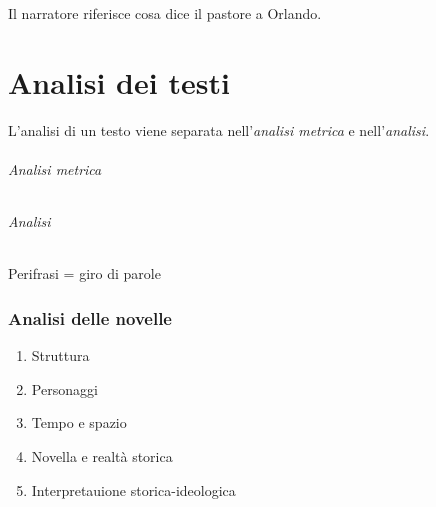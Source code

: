\documentclass[a4paper]{article}
\begin{document}
\begin{center} %
\begin{minipage}{0.5\textwidth}
\centering
{}
\end{minipage}
\end{center}

\begin{center} %
\begin{minipage}{0.5\textwidth}
\centering
{}
\end{minipage}
\end{center}

Il narratore riferisce cosa dice il pastore a Orlando.


\pagebreak

\part{Analisi dei testi}


L'analisi di un testo viene separata nell'\textit{analisi metrica} e nell'\textit{analisi}.

\paragraph{Analisi metrica}

\phantom{ }\vspace{0.1cm}

\paragraph{Analisi}

Perifrasi = giro di parole

\section{Analisi delle novelle}

\begin{enumerate}
    \item Struttura
    \item Personaggi
    \item Tempo e spazio
    \item Novella e realtà storica
    \item Interpretauione storica-ideologica
\end{enumerate}
\end{document}

